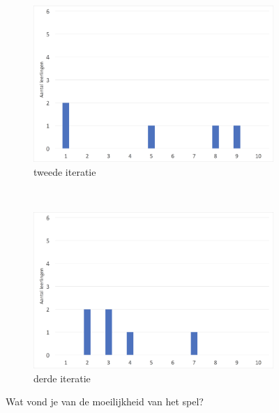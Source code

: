 \documentclass[11pt]{article}
\begin{document}
\begin{figure}
	\centering
    \begin{subfigure}[b]{0.48\textwidth}
        \includegraphics[width=\textwidth]{pictures/2_Moeilijkheid.png}
        \caption{tweede iteratie}
        \label{moeilijkheid:twee}
    \end{subfigure}
    ~
    \begin{subfigure}[b]{0.48\textwidth}
        \includegraphics[width=\textwidth]{pictures/3_Moeilijkheid.png}
        \caption{derde iteratie}
        \label{moeilijkheid:drie}
    \end{subfigure}
    \caption{Wat vond je van de moeilijkheid van het spel?}\label{moeilijkheid}
\end{figure}
\end{document}
